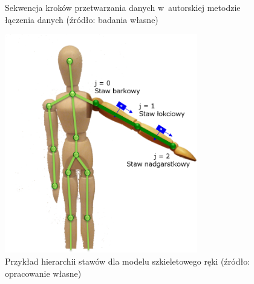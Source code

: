 \begin{figure}[!htb]
	\scalebox{0.7}{
		
	}
	\caption{Sekwencja kroków przetwarzania danych w~autorskiej metodzie łączenia danych (źródło: badania własne)}
	\label{fig:hybrid:stepsSequence}						
\end{figure}
\begin{figure}[!htb]
	\centering			
	\includegraphics[width=0.75\textwidth]{images/joints.png}
	\caption{Przykład hierarchii stawów dla modelu szkieletowego ręki (źródło: opracowanie własne)}		
	\label{fig:hybrid:jointsHierarchy}		
\end{figure}

